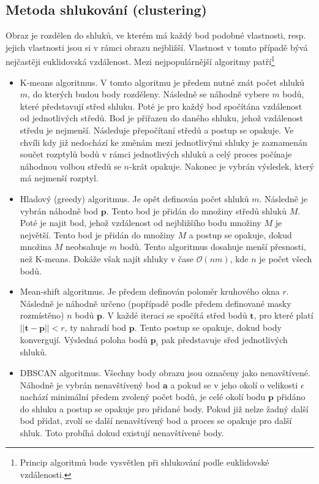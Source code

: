 \documentclass[twoside]{ctuthesis}
\newcommand{\tl}[1]{$\mathbf{#1}$}
\begin{document}
\subsection{Metoda shlukování (clustering)} Obraz je rozdělen do shluků, ve kterém má každý bod podobné vlastnosti, resp. jejich vlastnosti jsou si v rámci obrazu nejbližší. Vlastnost v tomto případě bývá nejčastěji euklidovská vzdálenost. Mezi nejpopulárnější algoritmy patří\footnote{Princip algoritmů bude vysvětlen při shlukování podle euklidovské vzdálenosti.}
    \begin{itemize}
        \item K-means algoritmus. V tomto algoritmu je předem nutné znát počet shluků $m$, do kterých budou body rozděleny. Následně se náhodně vybere $m$ bodů, které představují střed shluku. Poté je pro každý bod spočítána vzdálenost od jednotlivých středů. Bod je přiřazen do daného shluku, jehož vzdálenost středu je nejmenší. Následuje přepočítaní středů a postup se opakuje. Ve chvíli kdy již nedochází ke změnám mezi jednotlivými shluky je zaznamenán součet rozptylů bodů v rámci jednotlivých shluků a celý proces počínaje náhodnou volbou středů se $n$-krát opakuje. Nakonec je vybrán výsledek, který má nejmenší rozptyl.\cite{kmeans_seg}
        \item Hladový (greedy) algoritmus. Je opět definován počet shluků $m$. Následně je vybrán náhodně bod \tl{p}. Tento bod je přidán do množiny středů shluků $M$. Poté je najit bod, jehož vzdálenost od nejbližšího bodu množiny $M$ je největší. Tento bod je přidán do množiny $M$ a postup se opakuje, dokud množina $M$ neobsahuje $m$ bodů. Tento algoritmus dosahuje menší přesnosti, než K-means. Dokáže však najít shluky v čase $\mathcal{O}(nm)$, kde $n$ je počet všech bodů. \cite{trevor2013efficient, rusu2009close}
        \item Mean-shift algoritmus. Je předem definován poloměr kruhového okna $r$. Následně je náhodně určeno (popřípadě podle předem definované masky rozmístěno) $n$ bodů \tl{p}. V každé iteraci se spočítá střed bodů $\mathbf{t}$, pro které platí $||\mathbf{t} - \mathbf{p}|| < r$, ty nahradí bod \tl{p}. Tento postup se opakuje, dokud body konvergují. Výsledná poloha bodů $\mathbf{p}_i$ pak představuje sřed jednotlivých shluků. \cite{derpanis2005mean}
        \item DBSCAN algoritmus. Všechny body obrazu jsou označeny jako nenavštívené. Náhodně je vybrán nenavštívený bod \tl{a} a pokud se v jeho okolí o velikosti $\epsilon$ nachází minimální předem zvolený počet bodů, je celé okolí bodu \tl{p} přidáno do shluku a postup se opakuje pro přidané body. Pokud již nelze žadný další bod přidat, zvolí se další nenavštívený bod a proces se opakuje pro další shluk. Toto probíhá dokud existují nenavštívené body. \cite{dbscan_clustering}
    \end{itemize}
\end{document}
